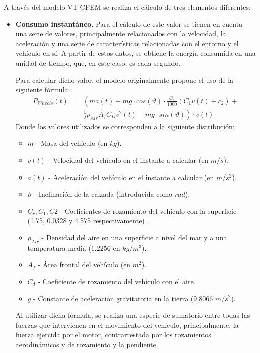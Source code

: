 \documentclass[11pt,spanish,listoffigures,listoftables]{tfgetsinf}
\begin{document}
A través del modelo VT-CPEM se realiza el cálculo de tres elementos diferentes:
\begin{itemize}
    \item \textbf{Consumo instantáneo}. Para el cálculo de este valor se tienen en cuenta una serie de valores, principalmente relacionados con la velocidad, la aceleración y una serie de características relacionadas con el entorno y el vehículo en sí. A partir de estos datos, se obtiene la energía consumida en una unidad de tiempo, que, en este caso, es cada segundo.
    
    Para calcular dicho valor, el modelo originalmente propone el uso de la siguiente fórmula:
    \begin{align*}
        P_{Wheels}(t) = & \left(ma(t) + mg\cdot cos(\vartheta) \cdot \frac{C_{r}}{1000}(C_{1}v(t) + c_{2}) + \right. \\ 
        & \left. \frac{1}{2}\rho_{Air}A_{f}C_{D}v^{2}(t) + mg \cdot sin(\vartheta) \right) \cdot v(t)
    \end{align*}
    Donde los valores utilizados se corresponden a la siguiente distribución:
    \begin{itemize}
        \item $m$ - Masa del vehículo (en $kg$).
        \item $v(t)$ - Velocidad del vehículo en el instante a calcular (en $m/s$).
        \item $a(t)$ - Aceleración del vehículo en el instante a calcular (en $m/s^2$).
        \item $\vartheta$ - Inclinación de la calzada (introducida como $rad$).
        \item $C_{r}, C_{1}, C{2}$ - Coeficientes de rozamiento del vehículo con la superficie (1.75, 0.0328 y 4.575 respectivamente) \cite{RAKHA2001}.
        \item $\rho_{Air}$ - Densidad del aire en una superficie a nivel del mar y a una temperatura media ($1.2256$ en $kg/m^3$).
        \item $A_{f}$ - Área frontal del vehículo (en $m^2$).
        \item $C_{d}$ - Coeficiente de rozamiento del vehículo con el aire.
        \item $g$ - Constante de aceleración gravitatoria en la tierra ($9.8066$ $m/s^2$).
    \end{itemize}
    
    Al utilizar dicha fórmula, se realiza una especie de sumatorio entre todas las fuerzas que intervienen en el movimiento del vehículo, principalmente, la fuerza ejercida por el motor, contrarrestada por los rozamientos aerodinámicos y de rozamiento y la pendiente.
    

\end{itemize}
\end{document}
